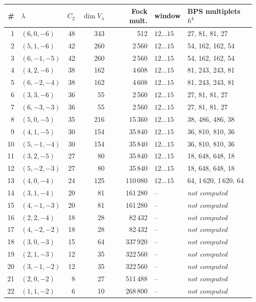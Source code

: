 \documentclass[10pt]{article}
\begin{document}
\begin{table}[p]\centering\small
\begin{tabular}{rlrrrll}
\toprule
\# & $\lambda$ & $C_2$ & $\dim V_\lambda$ & Fock mult. & window & BPS multiplets $h^k$\\
\midrule
1 & $(6,0,-6)$ & 48 & 343 & 512 & $12\ldots15$ & 27, 81, 81, 27\\
2 & $(5,1,-6)$ & 42 & 260 & 2\,560 & $12\ldots15$ & 54, 162, 162, 54\\
3 & $(6,-1,-5)$ & 42 & 260 & 2\,560 & $12\ldots15$ & 54, 162, 162, 54\\
4 & $(4,2,-6)$ & 38 & 162 & 4\,608 & $12\ldots15$ & 81, 243, 243, 81\\
5 & $(6,-2,-4)$ & 38 & 162 & 4\,608 & $12\ldots15$ & 81, 243, 243, 81\\
6 & $(3,3,-6)$ & 36 & 55 & 2\,560 & $12\ldots15$ & 27, 81, 81, 27\\
7 & $(6,-3,-3)$ & 36 & 55 & 2\,560 & $12\ldots15$ & 27, 81, 81, 27\\
8 & $(5,0,-5)$ & 35 & 216 & 15\,360 & $12\ldots15$ & 38, 486, 486, 38\\
9 & $(4,1,-5)$ & 30 & 154 & 35\,840 & $12\ldots15$ & 36, 810, 810, 36\\
10 & $(5,-1,-4)$ & 30 & 154 & 35\,840 & $12\ldots15$ & 36, 810, 810, 36\\
11 & $(3,2,-5)$ & 27 & 80 & 35\,840 & $12\ldots15$ & 18, 648, 648, 18\\
12 & $(5,-2,-3)$ & 27 & 80 & 35\,840 & $12\ldots15$ & 18, 648, 648, 18\\
13 & $(4,0,-4)$ & 24 & 125 & 110\,080 & $12\ldots15$ & 64, 1\,620, 1\,620, 64\\
14 & $(3,1,-4)$ & 20 & 81 & 161\,280 & -- & \emph{not computed}\\
15 & $(4,-1,-3)$ & 20 & 81 & 161\,280 & -- & \emph{not computed}\\
16 & $(2,2,-4)$ & 18 & 28 & 82\,432 & -- & \emph{not computed}\\
17 & $(4,-2,-2)$ & 18 & 28 & 82\,432 & -- & \emph{not computed}\\
18 & $(3,0,-3)$ & 15 & 64 & 337\,920 & -- & \emph{not computed}\\
19 & $(2,1,-3)$ & 12 & 35 & 322\,560 & -- & \emph{not computed}\\
20 & $(3,-1,-2)$ & 12 & 35 & 322\,560 & -- & \emph{not computed}\\
21 & $(2,0,-2)$ & 8 & 27 & 511\,488 & -- & \emph{not computed}\\
22 & $(1,1,-2)$ & 6 & 10 & 268\,800 & -- & \emph{not computed}\\

\end{tabular}
\end{table}
\end{document}
